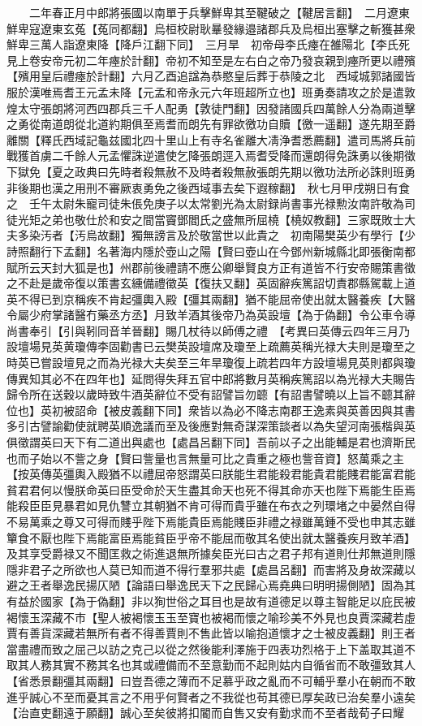 　　二年春正月中郎將張國以南單于兵擊鮮卑其至鞬破之【鞬居言翻】　二月遼東鮮卑寇遼東玄菟【菟同都翻】烏桓校尉耿曅發緣邉諸郡兵及烏桓出塞擊之斬獲甚衆鮮卑三萬人詣遼東降【降戶江翻下同】　三月旱　初帝母李氏瘞在雒陽北【李氏死見上卷安帝元初二年瘞於計翻】帝初不知至是左右白之帝乃發哀親到瘞所更以禮殯【殯用皇后禮瘞於計翻】六月乙酉追諡為恭愍皇后葬于恭陵之北　西域城郭諸國皆服於漢唯焉耆王元孟未降【元孟和帝永元六年班超所立也】班勇奏請攻之於是遣敦煌太守張朗將河西四郡兵三千人配勇【敦徒門翻】因發諸國兵四萬餘人分為兩道擊之勇從南道朗從北道約期俱至焉耆而朗先有罪欲徼功自贖【徼一遥翻】遂先期至爵離關【釋氏西域記龜兹國北四十里山上有寺名雀離大凊浄耆悉薦翻】遣司馬將兵前戰獲首虜二千餘人元孟懼誅逆遣使乞降張朗逕入焉耆受降而還朗得免誅勇以後期徵下獄免【夏之政典曰先時者殺無赦不及時者殺無赦張朗先期以徼功法所必誅則班勇非後期也漢之用刑不審厥衷勇免之後西域事去矣下遐稼翻】　秋七月甲戌朔日有食之　壬午太尉朱寵司徒朱倀免庚子以太常劉光為太尉録尚書事光禄勲汝南許敬為司徒光矩之弟也敬仕於和安之間當竇鄧閻氏之盛無所屈橈【橈奴教翻】三家既敗士大夫多染汚者【汚烏故翻】獨無謗言及於敬當世以此貴之　初南陽樊英少有學行【少詩照翻行下孟翻】名著海内隱於壺山之陽【賢曰壺山在今鄧州新城縣北即張衡南都賦所云天封大狐是也】州郡前後禮請不應公卿舉賢良方正有道皆不行安帝賜策書徵之不赴是歲帝復以策書玄纁備禮徵英【復扶又翻】英固辭疾篤詔切責郡縣駕載上道英不得已到京稱疾不肯起彊輿入殿【彊其兩翻】猶不能屈帝使出就太醫養疾【大醫令屬少府掌諸醫冇藥丞方丞】月致羊酒其後帝乃為英設壇【為于偽翻】令公車令導尚書奉引【引與靷同音羊晉翻】賜几杖待以師傅之禮　【考異曰英傳云四年三月乃設壇場見英黄瓊傳李固勸書已云樊英設壇席及瓊至上疏薦英稱光禄大夫則是瓊至之時英已嘗設壇見之而為光禄大夫矣至三年旱瓊復上疏若四年方設壇場見英則都與瓊傳異知其必不在四年也】延問得失拜五官中郎將數月英稱疾篤詔以為光禄大夫賜告歸令所在送穀以歲時致牛酒英辭位不受有詔譬旨勿聼【有詔書譬曉以上旨不聼其辭位也】英初被詔命【被皮義翻下同】衆皆以為必不降志南郡王逸素與英善因與其書多引古譬諭勸使就聘英順逸議而至及後應對無奇謀深策談者以為失望河南張楷與英俱徵謂英曰天下有二道出與處也【處昌呂翻下同】吾前以子之出能輔是君也濟斯民也而子始以不訾之身【賢曰訾量也言無量可比之貴重之極也訾音資】怒萬乘之主【按英傳英彊輿入殿猶不以禮屈帝怒謂英曰朕能生君能殺君能貴君能賤君能富君能貧君君何以慢朕命英曰臣受命於天生盡其命天也死不得其命亦天也陛下焉能生臣焉能殺臣臣見暴君如見仇讐立其朝猶不肯可得而貴乎雖在布衣之列環堵之中晏然自得不易萬乘之尊又可得而賤乎陛下焉能貴臣焉能賤臣非禮之禄雖萬鍾不受也申其志雖簞食不厭也陛下焉能富臣焉能貧臣乎帝不能屈而敬其名使出就太醫養疾月致羊酒】及其享受爵禄又不聞匡救之術進退無所據矣臣光曰古之君子邦有道則仕邦無道則隱隱非君子之所欲也人莫已知而道不得行羣邪共處【處昌呂翻】而害將及身故深藏以避之王者舉逸民揚仄陋【論語曰舉逸民天下之民歸心焉堯典曰明明揚側陋】固為其有益於國家【為于偽翻】非以狥世俗之耳目也是故有道德足以尊主智能足以庇民被褐懷玉深藏不市【聖人被褐懷玉玉至寶也被褐而懷之喻珍美不外見也良賈深藏若虛賈有善貨深藏若無所有者不得善賈則不售此皆以喻抱道懷才之士被皮義翻】則王者當盡禮而致之屈己以訪之克己以從之然後能利澤施于四表功烈格于上下盖取其道不取其人務其實不務其名也其或禮備而不至意勤而不起則姑内自循省而不敢彊致其人【省悉景翻彊其兩翻】曰豈吾德之薄而不足慕乎政之亂而不可輔乎羣小在朝而不敢進乎誠心不至而憂其言之不用乎何賢者之不我從也苟其德已厚矣政已治矣羣小遠矣【治直吏翻遠于願翻】誠心至矣彼將扣閽而自售又安有勤求而不至者哉荀子曰耀